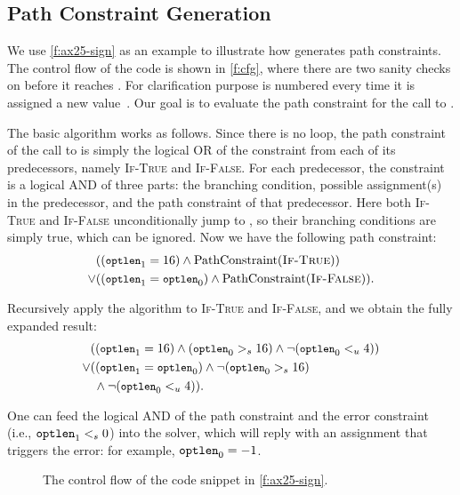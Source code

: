 \subsection{Path Constraint Generation}
\label{s:gen:path}

We use \autoref{f:ax25-sign} as an example to illustrate how \sys
generates path constraints.  The control flow of the code is shown
in \autoref{f:cfg}, where there are two sanity checks on 
before it reaches .  For clarification purpose
 is numbered every time it is assigned a new
value~\cite[\chapterautorefname~8.11]{whale}.  Our goal is to
evaluate the path constraint for the call to .

The basic algorithm works as follows.  Since there is no loop, the
path constraint of the call to  is simply the
logical OR of the constraint from each of its predecessors, namely
\textsc{If-True} and \textsc{If-False}.  For each predecessor, the
constraint is a logical AND of three parts: the branching condition,
possible assignment(s) in the predecessor, and the path constraint
of that predecessor.  Here both \textsc{If-True} and \textsc{If-False}
unconditionally jump to , so their branching
conditions are simply true, which can be ignored.  Now we have the
following path constraint:
\newcommand{\optlen}{{\small \texttt{optlen}}}
\newcommand{\pc}{\textrm{PathConstraint}}
%
\begin{align*}
& ((\optlen_1 = 16) \land \pc(\textsc{If-True})) \\
\lor & ((\optlen_1 = \optlen_0) \land \pc(\textsc{If-False})).
\end{align*}

Recursively apply the algorithm to \textsc{If-True} and \textsc{If-False},
and we obtain the fully expanded result:
%
\begin{align*}
& ((\optlen_1 = 16) \land (\optlen_0 >_s 16)
    \land \neg(\optlen_0 <_u 4)) \\
\lor & ((\optlen_1 = \optlen_0) \land \neg(\optlen_0 >_s 16) \\
     & \; \land \neg(\optlen_0 <_u 4)).
\end{align*}

One can feed the logical AND of the path constraint and the error
constraint (i.e., $\texttt{optlen}_1 <_s 0$) into the solver, which
will reply with an assignment that triggers the error: for example,
$\texttt{optlen}_0 = -1$.

\begin{figure}
\centering
\resizebox{\linewidth}{!}{

}
\caption{The control flow of the code snippet in \autoref{f:ax25-sign}.}
\label{f:cfg}
\end{figure}

